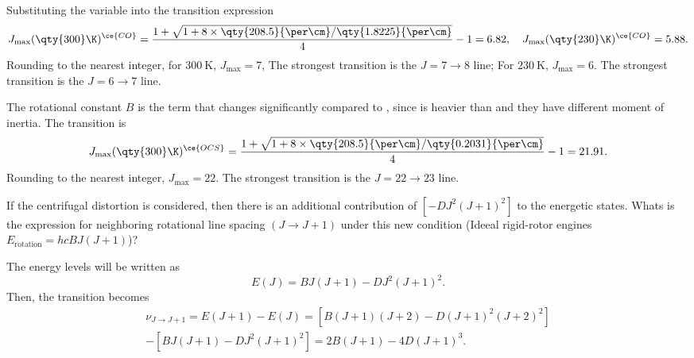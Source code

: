 \begin{solution}\leavevmode
  \begin{enumext}
    \item [(a) (b)]\enspace Substituting the variable into the transition
    expression
    \[
      J_{\max}(\qty{300}\K)^{\ce{CO}}
    = \frac{1 + \sqrt{1 + 8 \times
            \qty{208.5}{\per\cm}/\qty{1.8225}{\per\cm}}}{4} - 1 = 6.82, \quad
      J_{\max}(\qty{230}\K)^{\ce{CO}} = 5.88.
    \]
    Rounding to the nearest integer, for $\qty{300}\K$, $J_{\max} = 7$,
    The strongest transition is the $J = 7 \to 8$ line;
    For $\qty{230}\K$, $J_{\max} = 6$.
    The strongest transition is the $J = 6 \to 7$ line.
    \addtocounter{enumXi}{2}
    \item The rotational constant $B$ is the term that changes significantly
    compared to , since  is heavier than  and they have
    different moment of inertia. The transition is
    \[
      J_{\max}(\qty{300}\K)^{\ce{OCS}}
    = \frac{1 + \sqrt{1 + 8 \times
            \qty{208.5}{\per\cm}/\qty{0.2031}{\per\cm}}}{4} - 1 = 21.91.
    \]
    Rounding to the nearest integer, $J_{\max} = 22$.
    The strongest transition is the $J = 22 \to 23$ line.
  \end{enumext}
\end{solution}

\begin{problem}
  \leavevmode \vspace*{-.5\baselineskip}
  \begin{snugshade}
    If the centrifugal distortion is considered, then there is an additional
    contribution of $[-DJ^2 (J + 1)^2]$ to the energetic states.
    Whats is the expression for neighboring rotational line spacing
    $(J \to J + 1)$ under this new condition
    (Ideeal rigid-rotor engines $E_\text{rotation} = hcBJ(J + 1)$)?
  \end{snugshade}
\end{problem}
\begin{solution}
  The energy levels will be written as
  \[
    E(J) = BJ(J + 1) - DJ^2(J + 1)^2.
  \]
  Then, the transition becomes
  \begin{multline*}
    \nu_{J\to J+1} = E(J + 1) - E(J)
    = [B(J + 1)(J + 2) - D(J + 1)^2(J + 2)^2] \\ - [BJ(J + 1) - DJ^2(J + 1)^2]
    = 2B(J + 1) - 4D(J + 1)^3.
  \end{multline*}
\end{solution}